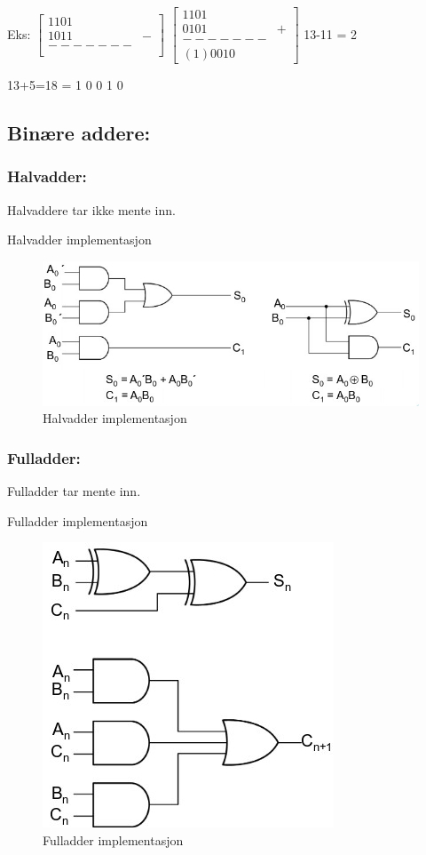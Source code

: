 \documentclass{article}
\begin{document}
	Eks: 
	$\begin{bmatrix}
	1 1 0 1 \\
	1 0 1 1 & -\\
	------- \\
	\end{bmatrix}$ 
	$\begin{bmatrix}
	1 1 0 1 \\
	0 1 0 1 & +\\
	------- \\
	(1) 0 0 1 0
	\end{bmatrix}$
	13-11 = 2
	
	13+5=18 = 1 0 0 1 0
	
	\subsection{Binære addere:}
	\subsubsection{Halvadder:}
	Halvaddere tar ikke mente inn.
	
	Halvadder implementasjon
	\begin{figure}[H]
		\includegraphics[scale = 0.7]{halvadd.jpg}
		\caption{Halvadder implementasjon}
	\end{figure}
	
	\subsubsection{Fulladder:}
	Fulladder tar mente inn.
	
	Fulladder implementasjon
	\begin{figure}[H]
		\includegraphics[scale = 0.7]{Fulladd.jpg}
		\caption{Fulladder implementasjon}
	\end{figure}
	
\end{document}
